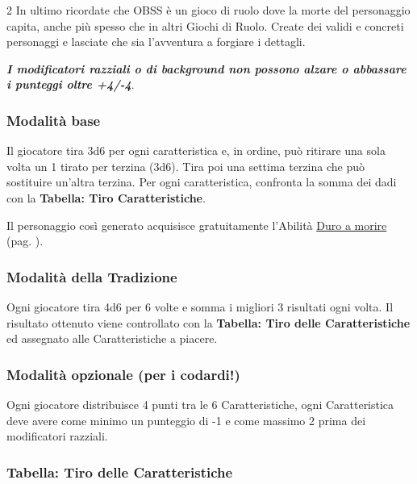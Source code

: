 \begin{multicols}{2}
In ultimo ricordate che OBSS è un gioco di ruolo dove la morte del personaggio capita, anche più spesso che in altri Giochi di Ruolo. Create dei validi e concreti personaggi e lasciate che sia l'avventura a forgiare i dettagli.

\textbf{\emph{I modificatori razziali o di background non possono alzare o abbassare i punteggi oltre +4/-4}}.

\subsubsection{Modalità base}\label{modalitabase}

Il giocatore tira 3d6 per ogni caratteristica e, in ordine, può ritirare una sola volta un 1 tirato per terzina (3d6). Tira poi una settima terzina che può sostituire un'altra terzina. Per ogni caratteristica, confronta la somma dei dadi con la \textbf{Tabella: Tiro Caratteristiche}.

Il personaggio così generato acquisisce gratuitamente l'Abilità \hyperlink{Duro a morire}{Duro a morire} (pag. \pageref{Duro a morire}).

\subsubsection{Modalità della Tradizione}\label{modalitadellatradizione}

Ogni giocatore tira 4d6 per 6 volte e somma i migliori 3 risultati ogni volta. Il risultato ottenuto viene controllato con la \textbf{Tabella: Tiro delle Caratteristiche} ed assegnato alle Caratteristiche a piacere.

\subsubsection{Modalità opzionale (per i codardi!)}\label{modalitapericodardi}

Ogni giocatore distribuisce 4 punti tra le 6 Caratteristiche, ogni Caratteristica deve avere come minimo un punteggio di -1 e come massimo 2 prima dei modificatori razziali.

\subsubsection{Tabella: Tiro delle Caratteristiche}


\end{multicols}
